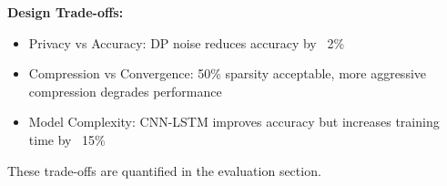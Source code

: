 \textbf{Design Trade-offs:}

\begin{itemize}
    \item Privacy vs Accuracy: DP noise reduces accuracy by ~2\%
    \item Compression vs Convergence: 50\% sparsity acceptable, more aggressive compression degrades performance
    \item Model Complexity: CNN-LSTM improves accuracy but increases training time by ~15\%
\end{itemize}

These trade-offs are quantified in the evaluation section.
